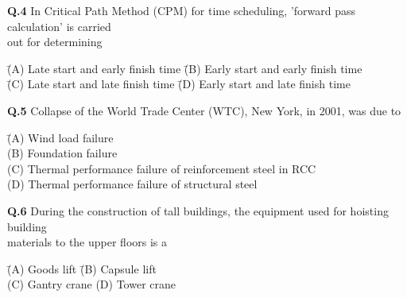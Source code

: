 \documentclass[journal,12pt,onecolumn]{IEEEtran}
\theoremstyle{remark}
\begin{document}
\textbf{Q.4}
\hspace{0.5cm} In Critical Path Method (CPM) for time scheduling, 'forward pass calculation' is carried \\
\hspace*{1.3cm} out for determining

\vspace{0.5em}

\begin{tabbing}
\hspace{2cm} \= (A) Late start and early finish time \hspace{2cm} \= (B) Early start and early finish time \\
\hspace{2cm} \= (C) Late start and late finish time \hspace{2.2cm} \= (D) Early start and late finish time
\end{tabbing}


\noindent\textbf{Q.5} \hspace{0.5em} Collapse of the World Trade Center (WTC), New York, in 2001, was due to

\vspace{0.5em}

\begin{tabbing}
\hspace{2cm} \= (A) Wind load failure \\
\> (B) Foundation failure \\
\> (C) Thermal performance failure of reinforcement steel in RCC \\
\> (D) Thermal performance failure of structural steel
\end{tabbing}

\vspace{1.5em}

\noindent\textbf{Q.6} \hspace{0.5em} During the construction of tall buildings, the equipment used for hoisting building\\
\hspace*{2.4em} materials to the upper floors is a

\vspace{0.5em}

\begin{tabbing}
\hspace{2cm} \= (A) Goods lift \hspace{3cm} \= (B) Capsule lift \\
\> (C) Gantry crane \> (D) Tower crane
\end{tabbing}
\end{document}
